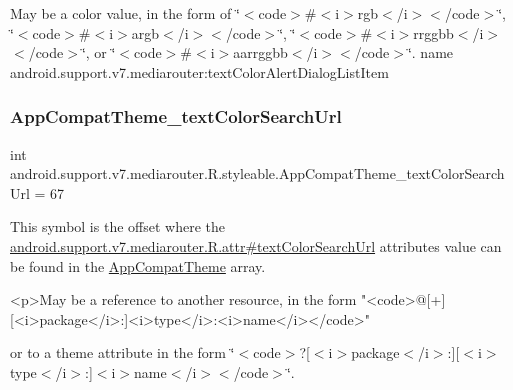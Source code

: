 May be a color value, in the form of \char`\"{}$<$code$>$\#$<$i$>$rgb$<$/i$>$$<$/code$>$\char`\"{}, \char`\"{}$<$code$>$\#$<$i$>$argb$<$/i$>$$<$/code$>$\char`\"{}, \char`\"{}$<$code$>$\#$<$i$>$rrggbb$<$/i$>$$<$/code$>$\char`\"{}, or \char`\"{}$<$code$>$\#$<$i$>$aarrggbb$<$/i$>$$<$/code$>$\char`\"{}.  name android.\+support.\+v7.\+mediarouter\+:text\+Color\+Alert\+Dialog\+List\+Item \mbox{\label{classandroid_1_1support_1_1v7_1_1mediarouter_1_1R_1_1styleable_a836d3802c62c78eac8fe21e652c6263b}} 
\subsubsection{\texorpdfstring{App\+Compat\+Theme\+\_\+text\+Color\+Search\+Url}{AppCompatTheme\_textColorSearchUrl}}
{\footnotesize\ttfamily int android.\+support.\+v7.\+mediarouter.\+R.\+styleable.\+App\+Compat\+Theme\+\_\+text\+Color\+Search\+Url = 67\hspace{0.3cm}{\ttfamily [static]}}

This symbol is the offset where the \hyperlink{classandroid_1_1support_1_1v7_1_1mediarouter_1_1R_1_1attr_a45a88a7030b0e2d50130e12bff42e368}{android.\+support.\+v7.\+mediarouter.\+R.\+attr\#text\+Color\+Search\+Url} attribute\textquotesingle{}s value can be found in the \hyperlink{classandroid_1_1support_1_1v7_1_1mediarouter_1_1R_1_1styleable_a4e3d3900c75d49aeb2f283cac00214d6}{App\+Compat\+Theme} array.

\begin{DoxyVerb}      <p>May be a reference to another resource, in the form "<code>@[+][<i>package</i>:]<i>type</i>:<i>name</i></code>"
\end{DoxyVerb}
 or to a theme attribute in the form \char`\"{}$<$code$>$?\mbox{[}$<$i$>$package$<$/i$>$\+:\mbox{]}\mbox{[}$<$i$>$type$<$/i$>$\+:\mbox{]}$<$i$>$name$<$/i$>$$<$/code$>$\char`\"{}. 

